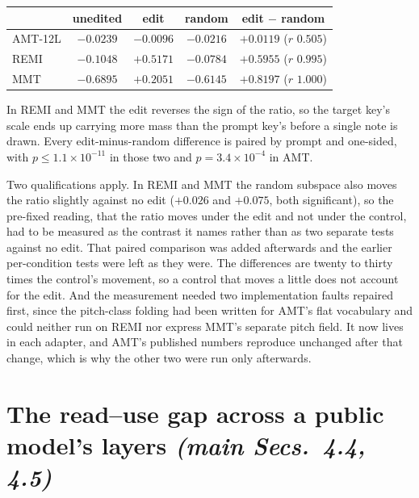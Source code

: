 \documentclass{article}
\begin{document}
\begin{center}\footnotesize
\begin{tabular}{@{}lcccc@{}}
\toprule
 & unedited & edit & random & edit $-$ random\\
\midrule
AMT-12L & $-0.0239$ & $-0.0096$ & $-0.0216$ & $+0.0119$ ($r$ $0.505$)\\
REMI    & $-0.1048$ & $+0.5171$ & $-0.0784$ & $+0.5955$ ($r$ $0.995$)\\
MMT     & $-0.6895$ & $+0.2051$ & $-0.6145$ & $+0.8197$ ($r$ $1.000$)\\
\bottomrule
\end{tabular}
\end{center}

In REMI and MMT the edit reverses the sign of the ratio, so the target key's scale
ends up carrying more mass than the prompt key's before a single note is drawn. Every
edit-minus-random difference is paired by prompt and one-sided, with
$p \le 1.1\times10^{-11}$ in those two and $p = 3.4\times10^{-4}$ in AMT.

Two qualifications apply. In REMI and MMT the random subspace also moves the ratio
slightly against no edit ($+0.026$ and $+0.075$, both significant), so the pre-fixed
reading, that the ratio moves under the edit and not under the control, had to be
measured as the contrast it names rather than as two separate tests against no edit.
That paired comparison was added afterwards and the earlier per-condition tests were
left as they were. The differences are twenty to thirty times the control's movement,
so a control that moves a little does not account for the edit. And the measurement
needed two implementation faults repaired first, since the pitch-class folding had been
written for AMT's flat vocabulary and could neither run on REMI nor express MMT's
separate pitch field. It now lives in each adapter, and AMT's published numbers
reproduce unchanged after that change, which is why the other two were run only
afterwards.

\section{The read--use gap across a public model's layers \normalfont\textit{(main Secs.~4.4, 4.5)}}
\label{sec:public-layers}
\end{document}
